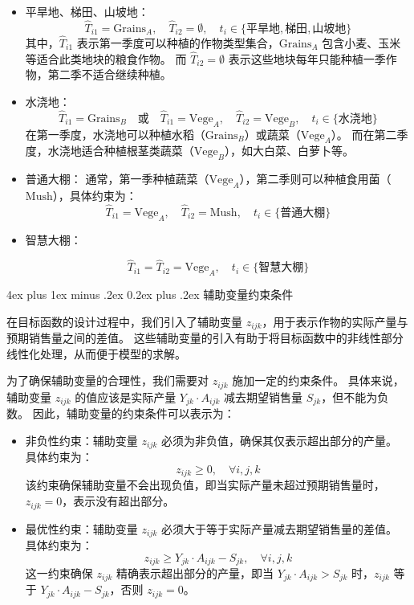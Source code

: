 \documentclass[12pt,a4paper]{nmmcm}
\makeatletter
\renewcommand\subsubsection{\@startsection{subsubsection}{3}{1em}%
  {4ex plus 1ex minus .2ex}%
  {0.2ex plus .2ex}%
  {\normalfont\large\bfseries}}
\makeatother
\begin{document}
\begin{itemize}
  \item 平旱地、梯田、山坡地：
        \[
          \hat{T}_{i1} = \text{Grains}_A, \quad \hat{T}_{i2} = \emptyset, \quad t_i \in \{\text{平旱地}, \text{梯田}, \text{山坡地}\}
        \]
        其中，$\hat{T}_{i1}$ 表示第一季度可以种植的作物类型集合，$\text{Grains}_A$ 包含小麦、玉米等适合此类地块的粮食作物。
        而 $\hat{T}_{i2} = \emptyset$ 表示这些地块每年只能种植一季作物，第二季不适合继续种植。


  \item 水浇地：
        \[
          \hat{T}_{i1} = \text{Grains}_B \quad \text{或} \quad \hat{T}_{i1} = \text{Vege}_A, \quad \hat{T}_{i2} = \text{Vege}_B, \quad t_i \in \{\text{水浇地}\}
        \]
        在第一季度，水浇地可以种植水稻（$\text{Grains}_B$）或蔬菜（$\text{Vege}_A$）。
        而在第二季度，水浇地适合种植根茎类蔬菜（$\text{Vege}_B$），如大白菜、白萝卜等。


  \item 普通大棚：
        通常，第一季种植蔬菜（$\text{Vege}_A$），第二季则可以种植食用菌（$\text{Mush}$），具体约束为：
        \[
          \hat{T}_{i1} = \text{Vege}_A, \quad \hat{T}_{i2} = \text{Mush}, \quad t_i \in \{\text{普通大棚}\}
        \]



  \item 智慧大棚：

        \[
          \hat{T}_{i1} = \hat{T}_{i2} = \text{Vege}_A, \quad t_i \in \{\text{智慧大棚}\}
        \]

\end{itemize}

\subsubsection{辅助变量约束条件}

在目标函数的设计过程中，我们引入了辅助变量 $z_{ijk}$，用于表示作物的实际产量与预期销售量之间的差值。
这些辅助变量的引入有助于将目标函数中的非线性部分线性化处理，从而便于模型的求解。


为了确保辅助变量的合理性，我们需要对 $z_{ijk}$ 施加一定的约束条件。
具体来说，辅助变量 $z_{ijk}$ 的值应该是实际产量 $Y_{jk} \cdot A_{ijk}$ 减去期望销售量 $S_{jk}$，但不能为负数。
因此，辅助变量的约束条件可以表示为：

\begin{itemize}
  \item 非负性约束：辅助变量 $z_{ijk}$ 必须为非负值，确保其仅表示超出部分的产量。
        具体约束为：
        \[
          z_{ijk} \geq 0, \quad \forall i, j, k
        \]
        该约束确保辅助变量不会出现负值，即当实际产量未超过预期销售量时，$z_{ijk} = 0$，表示没有超出部分。


  \item 最优性约束：辅助变量 $z_{ijk}$ 必须大于等于实际产量减去期望销售量的差值。
        具体约束为：
        \[
          z_{ijk} \geq Y_{jk} \cdot A_{ijk} - S_{jk}, \quad \forall i, j, k
        \]
        这一约束确保 $z_{ijk}$ 精确表示超出部分的产量，即当 $Y_{jk} \cdot A_{ijk} > S_{jk}$ 时，$z_{ijk}$ 等于 $Y_{jk} \cdot A_{ijk} - S_{jk}$，否则 $z_{ijk} = 0$。

\end{itemize}
\end{document}
